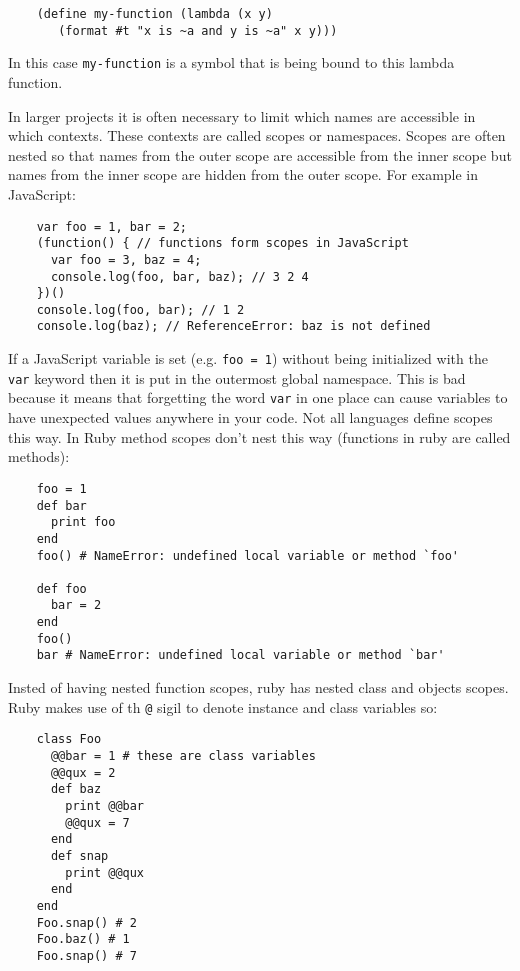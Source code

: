 \documentclass[11pt]{article}
\begin{document}
\begin{verbatim}
    (define my-function (lambda (x y)
       (format #t "x is ~a and y is ~a" x y)))
\end{verbatim}

   
   In this case \verb|my-function| is a symbol that is being bound to
   this lambda function.
   
   In larger projects it is often necessary to limit which names are
   accessible in which contexts.  These contexts are called scopes or
   namespaces.  Scopes are often nested so that names from the outer
   scope are accessible from the inner scope but names from the inner
   scope are hidden from the outer scope.  For example in JavaScript:
   
\begin{verbatim}
    var foo = 1, bar = 2;
    (function() { // functions form scopes in JavaScript
      var foo = 3, baz = 4;
      console.log(foo, bar, baz); // 3 2 4
    })()
    console.log(foo, bar); // 1 2
    console.log(baz); // ReferenceError: baz is not defined
\end{verbatim}

   
   If a JavaScript variable is set (e.g. \verb|foo = 1|) without being
   initialized with the \verb|var| keyword then it is put in the
   outermost global namespace. This is bad because it means that
   forgetting the word \verb|var| in one place can cause variables to
   have unexpected values anywhere in your code.  Not all languages
   define scopes this way.  In Ruby method scopes don't nest this way
   (functions in ruby are called methods):
   
\begin{verbatim}
    foo = 1
    def bar
      print foo
    end
    foo() # NameError: undefined local variable or method `foo'
    
    def foo
      bar = 2
    end
    foo()
    bar # NameError: undefined local variable or method `bar'
\end{verbatim}

   
   Insted of having nested function scopes, ruby has nested class and
   objects scopes.  Ruby makes use of th \verb|@| sigil to denote
   instance and class variables so:
   
\begin{verbatim}
    class Foo
      @@bar = 1 # these are class variables
      @@qux = 2
      def baz
        print @@bar
        @@qux = 7
      end
      def snap
        print @@qux
      end
    end
    Foo.snap() # 2
    Foo.baz() # 1
    Foo.snap() # 7
\end{verbatim}
\end{document}
